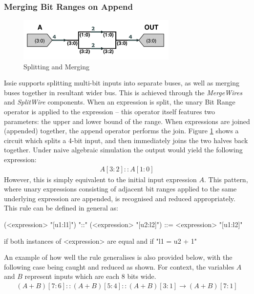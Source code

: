 \subsubsection{Merging Bit Ranges on Append}
\begin{figure}[h]
    \centering
    \includegraphics[width=0.7\textwidth]{05.ImpPlan/splitmerge.png}
    \caption{Splitting and Merging}
    \label{fig:splitmerge}
\end{figure}
Issie supports splitting multi-bit inputs into separate buses, as well as merging buses together in resultant wider bus. This is achieved through the \textit{MergeWires} and \textit{SplitWire} components. When an expression is split, the unary Bit Range operator is applied to the expression -- this operator itself features two parameters: the upper and lower bound of the range. When expressions are joined (appended) together, the append operator performs the join. Figure \ref{fig:splitmerge} shows a circuit which splits a 4-bit input, and then immediately joins the two halves back together. Under naive algebraic simulation the output would yield the following expression:
\begin{align}
    A[3:2] :: A[1:0]
\end{align}
However, this is simply equivalent to the initial input expression $A$. This pattern, where unary expressions consisting of adjacent bit ranges applied to the same underlying expression are appended, is recognised and reduced appropriately. This rule can be defined in general as:
\begin{grammar}
    (<expression> "[u1:l1]") "::" (<expression> "[u2:l2]") ::= <expression> "[u1:l2]"
    
    \textrm{if both instances of <expression> are equal and if "l1 = u2 + 1"}
\end{grammar}

An example of how well the rule generalises is also provided below, with the following case being caught and reduced as shown. For context, the variables $A$ and $B$ represent inputs which are each 8 bits wide.
\begin{align}
    (A + B)[7:6] :: (A + B)[5:4] :: (A + B)[3:1] \rightarrow (A + B)[7:1]
\end{align}

